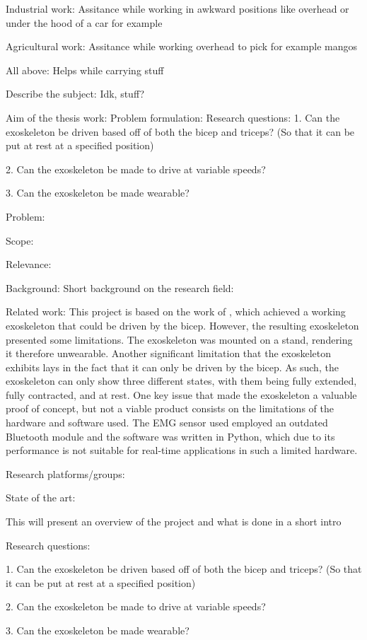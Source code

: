             Industrial work:
                Assitance while working in awkward positions like overhead or under the hood of a car for example

            Agricultural work:
                Assitance while working overhead to pick for example mangos
            
            All above:
                Helps while carrying stuff

    Describe the subject:
        Idk, stuff?

    Aim of the thesis work:
        Problem formulation: %
            Research questions:
                1.	Can the exoskeleton be driven based off of both the bicep and triceps? (So that it can be put at rest at a specified position)

                2.	Can the exoskeleton be made to drive at variable speeds?

                3.	Can the exoskeleton be made wearable?

            Problem:
                

            Scope:
            
            Relevance: %


Background: 
    Short background on the research field:

    Related work: %
        This project is based on the work of \cite{AFES}, which achieved a working exoskeleton that could be driven by the bicep. However, the resulting 
        exoskeleton presented some limitations. The exoskeleton was mounted on a stand, rendering it therefore unwearable. Another significant limitation 
        that the exoskeleton exhibits lays in the fact that it can only be driven by the bicep. As such, the exoskeleton can only show three different states, 
        with them being fully extended, fully contracted, and at rest. One key issue that made the exoskeleton a valuable proof of concept, but not a viable 
        product consists on the limitations of the hardware and software used. The EMG sensor used employed an outdated Bluetooth module and the software was 
        written in Python, which due to its performance is not suitable for real-time applications in such a limited hardware.

    Research platforms/groups:

    State of the art:


    This will present an overview of the project and what is done in a short intro


Research questions:

1.	Can the exoskeleton be driven based off of both the bicep and triceps? (So that it can be put at rest at a specified position)

2.	Can the exoskeleton be made to drive at variable speeds?

3.	Can the exoskeleton be made wearable?

